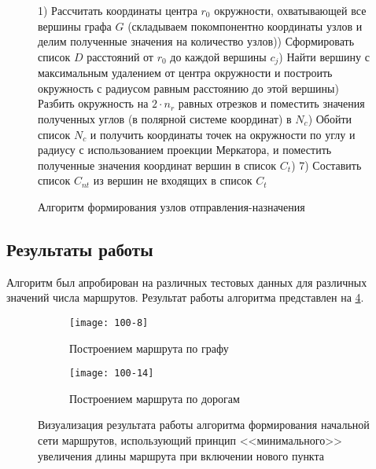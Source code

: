 \begin{figure}[ht!]
    \begin{algorithm}[H]
        1) Рассчитать координаты центра \( r_0 \) окружности, охватывающей все вершины графа \( G \) (складываем 
            покомпонентно координаты узлов и делим полученные значения на количество узлов)) Сформировать список \( D \) расстояний от \( r_0 \) до каждой вершины \( c_j \)) Найти вершину с максимальным удалением от центра окружности и построить окружность с радиусом 
            равным расстоянию до этой вершины) Разбить окружность на \( 2\cdot n_r \) равных отрезков и поместить значения полученных 
            углов (в полярной системе координат) в \( N_c \)) Обойти список \( N_c \) и получить координаты точек на окружности по углу и радиусу с 
            использованием проекции Меркатора, и поместить полученные значения координат вершин в 
            список \( C_t \)) 
        7) Составить список \( C_{nt} \) из вершин не входящих в список \( C_t \)\;
    \end{algorithm}
    \vspace*{-1.5em}
    \caption{Алгоритм формирования узлов отправления-назначения}
    \label{alg:convex-hull}
\end{figure}

\subsection{Результаты работы}
Алгоритм был апробирован на различных тестовых данных для различных значений числа маршрутов. Результат 
работы алгоритма представлен на \ref{img:min-length-01}.
\begin{figure}[h!]
    \centering
    \begin{subfigure}{0.75\textwidth}
        \texttt{[image: 100-8]}
        \caption{Построением маршрута по графу}
        \label{fig:graph}
    \end{subfigure}
    \begin{subfigure}{0.75\textwidth}
        \texttt{[image: 100-14]}
        \caption{Построением маршрута по дорогам}
        \label{fig:osrm}
    \end{subfigure}
    \caption{Визуализация результата работы алгоритма формирования начальной сети маршрутов, 
        использующий принцип <<минимального>> увеличения длины маршрута при включении нового пункта}
   \label{img:min-length-01}
\end{figure}

